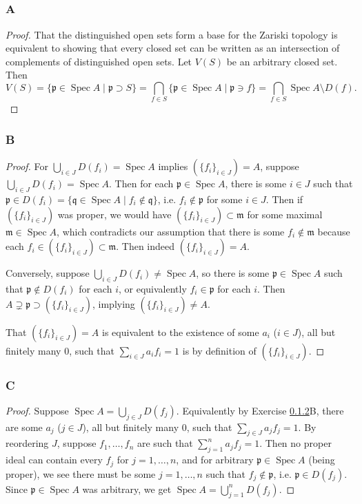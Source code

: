 \documentclass{article}
\newcommand{\frkm}{\mathfrak{m}}
\newcommand{\frkp}{\mathfrak{p}}
\newcommand{\frkq}{\mathfrak{q}}
\DeclareMathOperator{\Spec}{\mathrm{Spec}}
\theoremstyle{definition} %
\begin{document}
\subsection{}
\subsubsection{A}\label{3.5.A}
\begin{proof}
    That the distinguished open sets form a base for the Zariski topology is equivalent to showing that every closed set can be written as an intersection of complements of distinguished open sets. Let $V(S)$ be an arbitrary closed set. Then
    \[
    V(S)=\{\frkp \in \Spec A \mid \frkp \supset S\} = \bigcap_{f\in S} \{\frkp \in \Spec A \mid \frkp \ni f\}=\bigcap_{f\in S} \Spec A \setminus D(f).
    \]
\end{proof}
\subsubsection{B}\label{3.5.B}
\begin{proof}
    For $\bigcup_{i\in J} D(f_i) = \Spec A$ implies $(\{f_i\}_{i \in J})=A$, suppose $\bigcup_{i\in J} D(f_i)= \Spec A$. Then for each $\frkp \in \Spec A$, there is some $i\in J$ such that $\frkp \in D(f_i) = \{ \frkq \in \Spec A \mid f_i \notin \frkq\}$, i.e. $f_i \notin \frkp$ for some $i\in J$. Then if $(\{f_i\}_{i \in J})$ was proper, we would have $(\{f_i\}_{i \in J})\subset \frkm$ for some maximal $\frkm \in \Spec A$, which contradicts our assumption that there is some $f_i \notin \frkm$ because each $f_i \in (\{f_i\}_{i \in J})\subset \frkm$. Then indeed $(\{f_i\}_{i \in J})= A$.

    Conversely, suppose $\bigcup_{i\in J} D(f_i) \ne \Spec A$, so there is some $\frkp \in \Spec A$ such that $\frkp \notin D(f_i)$ for each $i$, or equivalently $f_i \in \frkp$ for each $i$. Then $A\supsetneq \frkp \supset (\{f_i\}_{i\in J})$, implying $(\{f_i\}_{i\in J}) \ne A$.

    That $(\{f_i\}_{i \in J})=A$ is equivalent to the existence of some $a_i$ ($i\in J$), all but finitely many $0$, such that $\sum_{i\in J} a_i f_i = 1$ is by definition of $(\{f_i\}_{i \in J})$.
\end{proof}
\subsubsection{C}\label{3.5.C}
\begin{proof}
    Suppose $\Spec A = \bigcup_{j\in J} D(f_j)$. Equivalently by Exercise \ref{3.5.B}B, there are some $a_j$ ($j\in J$), all but finitely many $0$, such that $\sum_{j\in J} a_j f_j = 1$. By reordering $J$, suppose $f_1,\dots,f_n$ are such that $\sum_{j=1}^n a_j f_j=1$. Then no proper ideal can contain every $f_j$ for $j=1,\dots, n$, and for arbitrary $\frkp \in \Spec A$ (being proper), we see there must be some $j=1,\dots, n$ such that $f_j\notin \frkp$, i.e. $\frkp \in D(f_j)$. Since $\frkp \in \Spec A$ was arbitrary, we get $\Spec A = \bigcup_{j=1}^n D(f_j)$. 
\end{proof}
\end{document}
